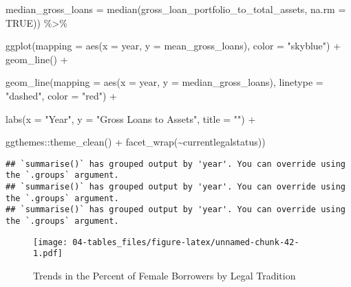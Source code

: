 \documentclass[a4paper,nobind]{templates/ociamthesis}
\newenvironment{Shaded}{\begin{snugshade}}{\end{snugshade}}
\newcommand{\AttributeTok}[1]{\textcolor[rgb]{0.77,0.63,0.00}{#1}}
\newcommand{\ConstantTok}[1]{\textcolor[rgb]{0.00,0.00,0.00}{#1}}
\newcommand{\FunctionTok}[1]{\textcolor[rgb]{0.00,0.00,0.00}{#1}}
\newcommand{\NormalTok}[1]{#1}
\newcommand{\SpecialCharTok}[1]{\textcolor[rgb]{0.00,0.00,0.00}{#1}}
\newcommand{\StringTok}[1]{\textcolor[rgb]{0.31,0.60,0.02}{#1}}
\renewenvironment{Shaded}
{
  \vspace{10pt}%
  \begin{snugshade}%
}{%
  \end{snugshade}%
  \vspace{8pt}%
}
\newcommand*{\bibtitle}{Works Cited}
\begin{document}
\begin{landscape}
\begin{Shaded}
\begin{Highlighting}[]
  \AttributeTok{median\_gross\_loans =} \FunctionTok{median}\NormalTok{(gross\_loan\_portfolio\_to\_total\_assets, }\AttributeTok{na.rm =} \ConstantTok{TRUE}\NormalTok{)) }\SpecialCharTok{\%\textgreater{}\%} 
  
  \FunctionTok{ggplot}\NormalTok{(}\AttributeTok{mapping =} \FunctionTok{aes}\NormalTok{(}\AttributeTok{x =}\NormalTok{ year, }\AttributeTok{y =}\NormalTok{ mean\_gross\_loans), }\AttributeTok{color =} \StringTok{"skyblue"}\NormalTok{) }\SpecialCharTok{+} \FunctionTok{geom\_line}\NormalTok{() }\SpecialCharTok{+}
  
  \FunctionTok{geom\_line}\NormalTok{(}\AttributeTok{mapping =} \FunctionTok{aes}\NormalTok{(}\AttributeTok{x =}\NormalTok{ year, }\AttributeTok{y =}\NormalTok{ median\_gross\_loans), }\AttributeTok{linetype =} \StringTok{"dashed"}\NormalTok{, }\AttributeTok{color =} \StringTok{"red"}\NormalTok{) }\SpecialCharTok{+}
  
  \FunctionTok{labs}\NormalTok{(}\AttributeTok{x =} \StringTok{"Year"}\NormalTok{, }\AttributeTok{y =} \StringTok{"Gross Loans to Assets"}\NormalTok{, }\AttributeTok{title =} \StringTok{""}\NormalTok{) }\SpecialCharTok{+} 
  
\NormalTok{  ggthemes}\SpecialCharTok{::}\FunctionTok{theme\_clean}\NormalTok{() }\SpecialCharTok{+} \FunctionTok{facet\_wrap}\NormalTok{(}\SpecialCharTok{\textasciitilde{}}\NormalTok{currentlegalstatus))}
\end{Highlighting}
\end{Shaded}

\begin{verbatim}
## `summarise()` has grouped output by 'year'. You can override using the `.groups` argument.
## `summarise()` has grouped output by 'year'. You can override using the `.groups` argument.
## `summarise()` has grouped output by 'year'. You can override using the `.groups` argument.
\end{verbatim}

\begin{figure}
\centering
\texttt{[image: 04-tables\_files/figure-latex/unnamed-chunk-42-1.pdf]}
\caption{\label{fig:unnamed-chunk-42}Trends in the Percent of Female Borrowers by Legal Tradition}
\end{figure}

\end{landscape}




\setlength{\baselineskip}{0pt} %

{\renewcommand*\MakeUppercase[1]{#1}%
\printbibliography[heading=bibintoc,title={\bibtitle}]}
\end{document}
